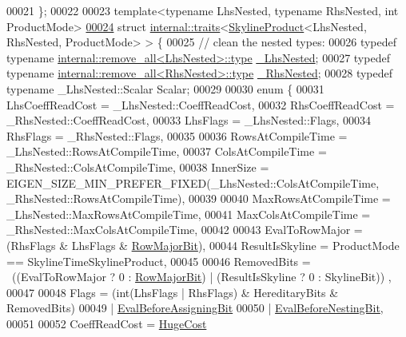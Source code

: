\begin{DoxyCode}
00021 \};
00022 
00023 \textcolor{keyword}{template}<\textcolor{keyword}{typename} LhsNested, \textcolor{keyword}{typename} RhsNested, \textcolor{keywordtype}{int} ProductMode>
\hyperlink{struct_eigen_1_1internal_1_1traits_3_01_skyline_product_3_01_lhs_nested_00_01_rhs_nested_00_01_product_mode_01_4_01_4}{00024} \textcolor{keyword}{struct }\hyperlink{struct_eigen_1_1internal_1_1traits}{internal::traits}<\hyperlink{class_eigen_1_1internal_1_1_skyline_product}{SkylineProduct}<LhsNested, RhsNested, ProductMode> > \{
00025     \textcolor{comment}{// clean the nested types:}
00026     \textcolor{keyword}{typedef} \textcolor{keyword}{typename} \hyperlink{group___sparse_core___module}{internal::remove\_all<LhsNested>::type} 
      \hyperlink{group___sparse_core___module}{\_LhsNested};
00027     \textcolor{keyword}{typedef} \textcolor{keyword}{typename} \hyperlink{group___sparse_core___module}{internal::remove\_all<RhsNested>::type} 
      \hyperlink{group___sparse_core___module}{\_RhsNested};
00028     \textcolor{keyword}{typedef} \textcolor{keyword}{typename} \_LhsNested::Scalar Scalar;
00029 
00030     \textcolor{keyword}{enum} \{
00031         LhsCoeffReadCost = \_LhsNested::CoeffReadCost,
00032         RhsCoeffReadCost = \_RhsNested::CoeffReadCost,
00033         LhsFlags = \_LhsNested::Flags,
00034         RhsFlags = \_RhsNested::Flags,
00035 
00036         RowsAtCompileTime = \_LhsNested::RowsAtCompileTime,
00037         ColsAtCompileTime = \_RhsNested::ColsAtCompileTime,
00038         InnerSize = EIGEN\_SIZE\_MIN\_PREFER\_FIXED(\_LhsNested::ColsAtCompileTime, 
      \_RhsNested::RowsAtCompileTime),
00039 
00040         MaxRowsAtCompileTime = \_LhsNested::MaxRowsAtCompileTime,
00041         MaxColsAtCompileTime = \_RhsNested::MaxColsAtCompileTime,
00042 
00043         EvalToRowMajor = (RhsFlags & LhsFlags & \hyperlink{group__flags_gae4f56c2a60bbe4bd2e44c5b19cbe8762}{RowMajorBit}),
00044         ResultIsSkyline = ProductMode == SkylineTimeSkylineProduct,
00045 
00046         RemovedBits = ~((EvalToRowMajor ? 0 : \hyperlink{group__flags_gae4f56c2a60bbe4bd2e44c5b19cbe8762}{RowMajorBit}) | (ResultIsSkyline ? 0 : SkylineBit))
      ,
00047 
00048         Flags = (int(LhsFlags | RhsFlags) & HereditaryBits & RemovedBits)
00049         | \hyperlink{group__flags_ga0972b20dc004d13984e642b3bd12532e}{EvalBeforeAssigningBit}
00050         | \hyperlink{group__flags_gaa34e83bae46a8eeae4e69ebe3aaecbed}{EvalBeforeNestingBit},
00051 
00052         CoeffReadCost = \hyperlink{namespace_eigen_a3163430a1c13173faffde69016b48aaf}{HugeCost}

\end{DoxyCode}
